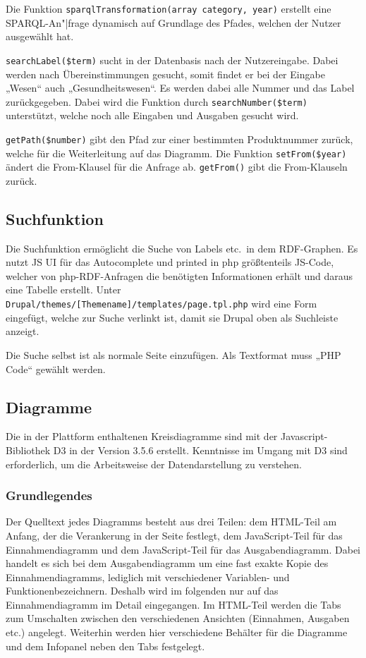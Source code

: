 \documentclass[a4paper,11pt,twoside]{article}
\begin{document}
Die Funktion \texttt{sparqlTransformation(array category, year)} erstellt eine
SPARQL-An"|frage dynamisch auf Grundlage des Pfades, welchen der Nutzer
ausgewählt hat.

\texttt{searchLabel(\$term)} sucht in der Datenbasis nach der Nutzereingabe.
Dabei werden nach Übereinstimmungen gesucht, somit findet er bei der Eingabe
„Wesen“ auch „Gesundheitswesen“. Es werden dabei alle Nummer und das Label
zurückgegeben. Dabei wird die Funktion durch \texttt{searchNumber(\$term)}
unterstützt, welche noch alle Eingaben und Ausgaben gesucht wird.

\texttt{getPath(\$number)} gibt den Pfad zur einer bestimmten Produktnummer
zurück, welche für die Weiterleitung auf das Diagramm.  Die Funktion
\texttt{setFrom(\$year)} ändert die From-Klausel für die Anfrage ab.
\texttt{getFrom()} gibt die From-Klauseln zurück.

\subsection{Suchfunktion}
Die Suchfunktion ermöglicht die Suche von Labels etc.\ in dem RDF-Graphen.  Es
nutzt JS UI für das Autocomplete und printed in php größtenteils JS-Code,
welcher von php-RDF-Anfragen die benötigten Informationen erhält und daraus
eine Tabelle erstellt.  Unter
\texttt{Drupal/themes/[Themename]/templates/page.tpl.php} wird eine Form
eingefügt, welche zur Suche verlinkt ist, damit sie Drupal oben als Suchleiste
anzeigt.

Die Suche selbst ist als normale Seite einzufügen. Als Textformat muss „PHP
Code“ gewählt werden.

\subsection{Diagramme}

Die in der Plattform enthaltenen Kreisdiagramme sind mit der
Javascript-Bibliothek D3 in der Version 3.5.6 \cite{D3} erstellt.  Kenntnisse
im Umgang mit D3 sind erforderlich, um die Arbeitsweise der Datendarstellung
zu verstehen.

\subsubsection{Grundlegendes}

Der Quelltext jedes Diagramms besteht aus drei Teilen: dem HTML-Teil am
Anfang, der die Verankerung in der Seite festlegt, dem JavaScript-Teil für das
Einnahmendiagramm und dem JavaScript-Teil für das Ausgabendiagramm. Dabei
handelt es sich bei dem Ausgabendiagramm um eine fast exakte Kopie des
Einnahmendiagramms, lediglich mit verschiedener Variablen- und
Funktionenbezeichnern.  Deshalb wird im folgenden nur auf das
Einnahmendiagramm im Detail eingegangen. Im HTML-Teil werden die Tabs zum
Umschalten zwischen den verschiedenen Ansichten (Einnahmen, Ausgaben etc.)
angelegt. Weiterhin werden hier verschiedene Behälter für die Diagramme und
dem Infopanel neben den Tabs festgelegt.
\end{document}

